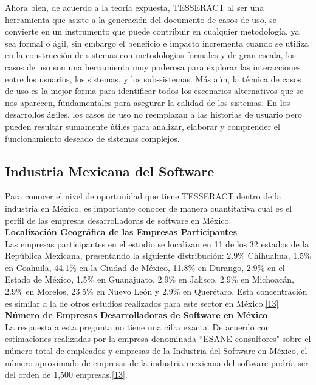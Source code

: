 Ahora bien, de acuerdo a la teoría expuesta, TESSERACT al ser una herramienta que asiste a la generación del documento de casos de uso, se convierte en un instrumento que puede contribuir en cualquier metodología, ya sea formal o ágil, sin embargo el beneficio e impacto incrementa cuando se utiliza en la construcción de sistemas con metodologias formales y de gran escala, los casos de uso son una herramienta muy poderosa para explorar las interacciones entre los usuarios, los sistemas, y los sub-sistemas. Más aún, la técnica de casos de uso es la mejor forma para identificar todos los escenarios alternativos que se nos aparecen, fundamentales para asegurar la calidad de los sistemas. En los desarrollos ágiles, los casos de uso no reemplazan a las historias de usuario pero pueden resultar sumamente útiles para analizar, elaborar y comprender el funcionamiento deseado de sistemas complejos.

\subsection{Industria Mexicana del Software}

Para conocer el nivel de oportunidad que tiene TESSERACT dentro de la industria en México, es importante conocer de manera cuantitativa cual es el perfil de las empresas desarrolladoras de software en México.\\

\textbf{Localización Geográfica de las Empresas Participantes}\\
 
Las empresas participantes en el estudio se localizan en 11 de los 32 estados de la República Mexicana, presentando la siguiente distribución: 2.9\% Chihuahua, 1.5\%  en Coahuila, 44.1\%  en la Ciudad de México, 11.8\%  en Durango, 2.9\%  en el Estado de México, 1.5\%  en Guanajuato, 2.9\%  en Jalisco, 2.9\%  en Michoacán, 2.9\%  en Morelos, 23.5\%  en Nuevo León y 2.9\%  en Querétaro. Esta concentración es similar a la de otros estudios realizados para este sector en México.\hyperlink{b13}{[13]}\\

\textbf{Número de Empresas Desarrolladoras de Software en México}\\

La respuesta a esta pregunta no tiene una cifra exacta. De acuerdo con estimaciones realizadas por la empresa denominada ``ESANE consultores" sobre el número total de empleados y empresas de la Industria del Software en México, el número aproximado de empresas de la industria mexicana del software podría ser del orden de 1,500 empresas.\hyperlink{b13}{[13]}.\\
 
